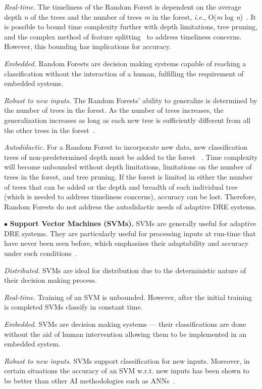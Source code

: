 \documentclass[conference]{IEEEtran}
\begin{document}
\emph{Real-time.} The timeliness of the Random Forest is dependent on the average depth \emph{n} of the trees and the number of trees \emph{m} in the forest, \emph{i.e.}, O(\emph{m} log \emph{n})~\cite{Lin:06}. It is possible to bound time complexity further with depth limitations, tree pruning, and the complex method of feature splitting~\cite{Ho:95} to address timeliness concerns. However, this bounding has implications for accuracy.

\emph{Embedded.} Random Forests are decision making systems capable of reaching a classification without the interaction of a human, fulfilling the requirement of embedded systems.

\emph{Robust to new inputs.} The Random Forests' ability to generalize is determined by the number of trees in the forest. As the number of trees increases, the generalization increases as long as each new tree is sufficiently different from all the other trees in the forest~\cite{Ho:95}.

\emph{Autodidactic.} For a Random Forest to incorporate new data, new classification trees of non-predetermined depth must be added to the forest ~\cite{Lin:06}. Time complexity will become unbounded without depth limitations, limitations on the number of trees in the forest, and tree pruning. If the forest is limited in either the number of trees that can be added or the depth and breadth of each individual tree (which is needed to address timeliness concerns), accuracy can be lost. Therefore, Random Forests do not address the autodidactic needs of adaptive DRE systems. 

$\bullet$ {\bf Support Vector Machines (SVMs).} SVMs are generally useful for adaptive DRE systems. They are particularly useful for processing inputs at run-time that have never been seen before, which emphasizes their adaptability and accuracy under such conditions~\cite{Hoffert:11}.

\emph{Distributed.} SVMs are ideal for distribution due to the deterministic nature of their decision making process.

\emph{Real-time.} Training of an SVM is unbounded. However, after the initial training is completed SVMs classify in constant time.

\emph{Embedded.} SVMs are decision making systems --- their classifications are done without the aid of human intervention allowing them to be implemented in an embedded system.

\emph{Robust to new inputs.} SVMs support classification for new inputs. Moreover, in certain situations the accuracy of an SVM w.r.t. new  inputs has been shown to be better than other AI methodologies such as ANNs~\cite{Hoffert:11}.
\end{document}
